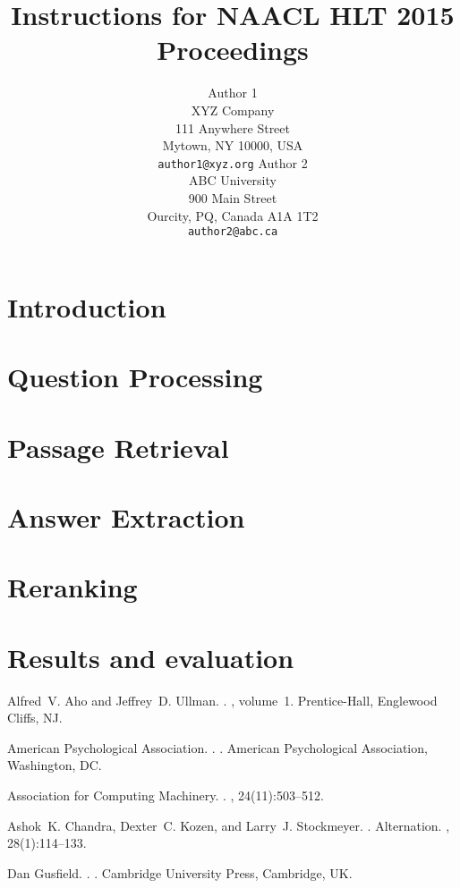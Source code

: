 \documentclass[11pt,letterpaper]{article}
\title{Instructions for NAACL HLT 2015 Proceedings}
\author{Author 1\\
	    XYZ Company\\
	    111 Anywhere Street\\
	    Mytown, NY 10000, USA\\
	    {\tt author1@xyz.org}
	  \And
	Author 2\\
  	ABC University\\
  	900 Main Street\\
  	Ourcity, PQ, Canada A1A 1T2\\
  {\tt author2@abc.ca}}
\date{}
\begin{document}
\maketitle
\begin{abstract}

\end{abstract}
\section{Introduction}

\section{Question Processing}

\section{Passage Retrieval}

\section{Answer Extraction}

\section{Reranking}

\section{Results and evaluation}


\begin{thebibliography}{}

Alfred~V. Aho and Jeffrey~D. Ullman.
.
, volume~1.
\newblock Prentice-{Hall}, Englewood Cliffs, NJ.

{American Psychological Association}.
.
.
\newblock American Psychological Association, Washington, DC.

{Association for Computing Machinery}.
.
, 24(11):503--512.

Ashok~K. Chandra, Dexter~C. Kozen, and Larry~J. Stockmeyer.
.
\newblock Alternation.
,
  28(1):114--133.

Dan Gusfield.
.
.
\newblock Cambridge University Press, Cambridge, UK.

\end{thebibliography}
\end{document}
